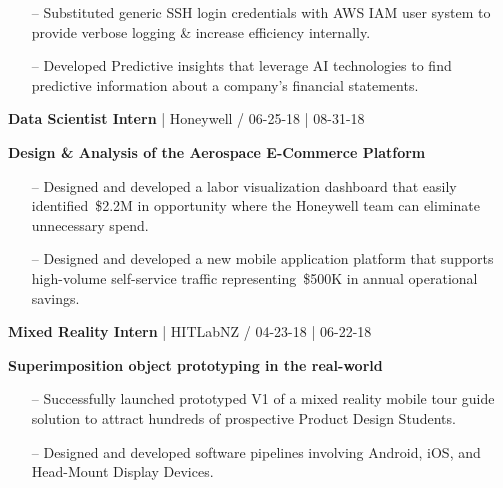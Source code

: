 \documentclass{article}
\begin{document}
\begin{multicols}{2}
{{\begin{itemize}
	\item[--] Substituted generic SSH login credentials with AWS IAM user system to provide verbose logging \& increase efficiency internally.
	\item[--] Developed Predictive insights that leverage AI technologies to find predictive information about a company's financial statements.
\end{itemize} 
}}
\hfill \break
{\footnotesize{\textbf{Data Scientist Intern} | Honeywell / 06-25-18 | 08-31-18}}
{\footnotesize{
\newline\textbf{Design \& Analysis of the Aerospace E-Commerce Platform}
\begin{itemize}
	\item[--] Designed and developed a labor visualization dashboard that easily identified~\$2.2M  in opportunity where the Honeywell team can eliminate unnecessary spend. 
	\item[--] Designed and developed a new mobile application platform that supports high-volume self-service traffic representing~\$500K in annual operational savings.
\end{itemize}
}}
\hfill \break
{\footnotesize{\textbf{Mixed Reality Intern} | HITLabNZ / 04-23-18 | 06-22-18 }}
{\footnotesize{
\newline\textbf{Superimposition object prototyping in the real-world }
\begin{itemize}
	\item[--] Successfully launched prototyped V1 of a mixed reality mobile tour guide solution to attract hundreds of prospective Product Design Students.
	\item[--] Designed and developed software pipelines involving Android, iOS, and Head-Mount Display Devices.
\end{itemize}
}}

\end{multicols}
\end{document}

